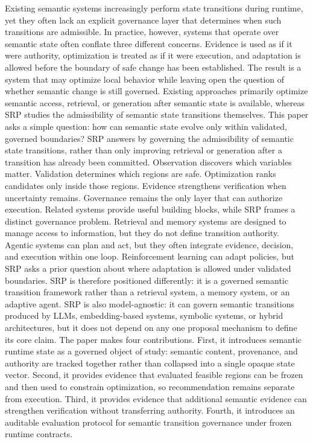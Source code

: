 \markdownRendererDocumentBegin
\markdownRendererSectionBegin
{}\markdownRendererInterblockSeparator
{}Existing semantic systems increasingly perform state transitions during runtime, yet they often lack an explicit governance layer that determines when such transitions are admissible. In practice, however, systems that operate over semantic state often conflate three different concerns. Evidence is used as if it were authority, optimization is treated as if it were execution, and adaptation is allowed before the boundary of safe change has been established. The result is a system that may optimize local behavior while leaving open the question of whether semantic change is still governed.\markdownRendererParagraphSeparator
{}Existing approaches primarily optimize semantic access, retrieval, or generation after semantic state is available, whereas SRP studies the admissibility of semantic state transitions themselves.\markdownRendererParagraphSeparator
{}This paper asks a simple question: how can semantic state evolve only within validated, governed boundaries? SRP answers by governing the admissibility of semantic state transitions, rather than only improving retrieval or generation after a transition has already been committed. Observation discovers which variables matter. Validation determines which regions are safe. Optimization ranks candidates only inside those regions. Evidence strengthens verification when uncertainty remains. Governance remains the only layer that can authorize execution.\markdownRendererParagraphSeparator
{}Related systems provide useful building blocks, while SRP frames a distinct governance problem. Retrieval and memory systems are designed to manage access to information, but they do not define transition authority. Agentic systems can plan and act, but they often integrate evidence, decision, and execution within one loop. Reinforcement learning can adapt policies, but SRP asks a prior question about where adaptation is allowed under validated boundaries. SRP is therefore positioned differently: it is a governed semantic transition framework rather than a retrieval system, a memory system, or an adaptive agent.\markdownRendererParagraphSeparator
{}SRP is also model-agnostic: it can govern semantic transitions produced by LLMs, embedding-based systems, symbolic systems, or hybrid architectures, but it does not depend on any one proposal mechanism to define its core claim.\markdownRendererParagraphSeparator
{}The paper makes four contributions. First, it introduces semantic runtime state as a governed object of study: semantic content, provenance, and authority are tracked together rather than collapsed into a single opaque state vector. Second, it provides evidence that evaluated feasible regions can be frozen and then used to constrain optimization, so recommendation remains separate from execution. Third, it provides evidence that additional semantic evidence can strengthen verification without transferring authority. Fourth, it introduces an auditable evaluation protocol for semantic transition governance under frozen runtime contracts.\markdownRendererParagraphSeparator
